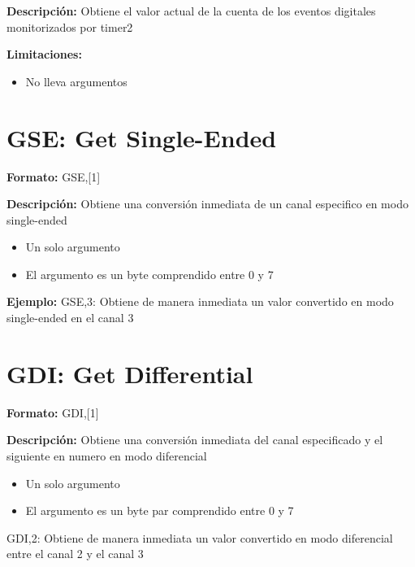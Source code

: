 \textbf{Descripción:}
Obtiene el valor actual de la cuenta de los eventos digitales monitorizados por timer2

\textbf{Limitaciones:}
\begin{itemize}
  \item No lleva argumentos
\end{itemize}


\section{GSE: Get Single-Ended} %
\label{sub:gse_get_single_ended}
\textbf{Formato:} GSE,[1]

\textbf{Descripción:}
Obtiene una conversión inmediata de un canal especifico en modo single-ended

\begin{itemize}
  \item Un solo argumento
  \item El argumento es un byte comprendido entre 0 y 7
\end{itemize}

\textbf{Ejemplo:}
GSE,3: Obtiene de manera inmediata un valor convertido en modo single-ended en el canal 3


\section{GDI: Get Differential} %
\label{sub:gdi_get_differential}
\textbf{Formato:} GDI,[1]

\textbf{Descripción:}
Obtiene una conversión inmediata del canal especificado y el siguiente en numero en modo diferencial

\begin{itemize}
  \item Un solo argumento
  \item El argumento es un byte par comprendido entre 0 y 7
\end{itemize}

GDI,2: Obtiene de manera inmediata un valor convertido en modo diferencial entre el canal 2 y el canal 3 

